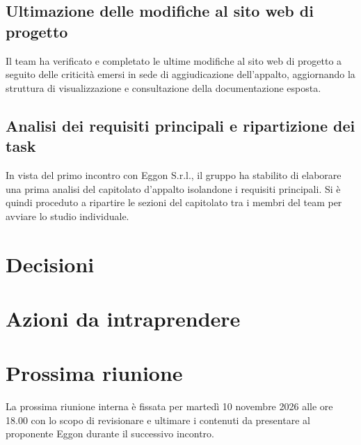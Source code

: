 \documentclass[interno]{gpt}
\begin{document}
\subsection{Ultimazione delle modifiche al sito web di progetto}
Il team ha verificato e completato le ultime modifiche al sito web di progetto a seguito delle criticità emersi in sede di aggiudicazione dell'appalto, aggiornando la struttura di visualizzazione e consultazione della documentazione esposta.

\subsection{Analisi dei requisiti principali e ripartizione dei task}
In vista del primo incontro con Eggon S.r.l., il gruppo ha stabilito di elaborare una prima analisi del capitolato d'appalto isolandone i requisiti principali. Si è quindi proceduto a ripartire le sezioni del capitolato tra i membri del team per avviare lo studio individuale.

\section{Decisioni}
\begin{decisioni}
\end{decisioni}

\section{Azioni da intraprendere}
\begin{azioni}
\end{azioni}

\section{Prossima riunione}
La prossima riunione interna è fissata per martedì 10 novembre 2026 alle ore 18.00 con lo scopo di revisionare e ultimare i contenuti da presentare al proponente Eggon durante il successivo incontro. 
\end{document}
